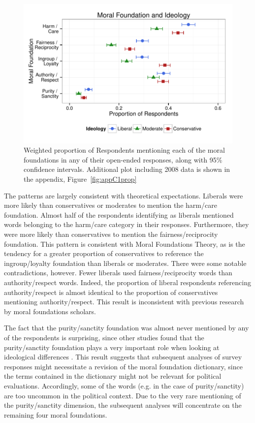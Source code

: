 \documentclass[12pt]{article}
\begin{document}
\begin{figure}[h]\centering
\includegraphics[scale=.9]{../calc/fig/fig1prop.pdf}
\caption{Weighted proportion of Respondents mentioning each of the moral foundations in any of their open-ended responses, along with 95\% confidence intervals. Additional plot including 2008 data is shown in the appendix, Figure~\ref{fig:appC1prop}}\label{fig:1prop}
\end{figure}

The patterns are largely consistent with theoretical expectations. Liberals were more likely than conservatives or moderates to mention the harm/care foundation. Almost half of the respondents identifying as liberals mentioned words belonging to the harm/care category in their responses. Furthermore, they were more likely than conservatives to mention the fairness/reciprocity foundation. This pattern is consistent with Moral Foundations Theory, as is the tendency for a greater proportion of conservatives to reference the ingroup/loyalty foundation than liberals or moderates. There were some notable contradictions, however. Fewer liberals used fairness/reciprocity words than authority/respect words. Indeed, the proportion of liberal respondents referencing authority/respect is almost identical to the proportion of conservatives mentioning authority/respect. This result is inconsistent with previous research by moral foundations scholars.

The fact that the purity/sanctity foundation was almost never mentioned by any of the respondents is surprising, since other studies found that the purity/sanctity foundation plays a very important role when looking at ideological differences \citep{koleva2012tracing}. This result suggests that subsequent analyses of survey responses might necessitate a revision of the moral foundation dictionary, since the terms contained in the dictionary might not be relevant for political evaluations. Accordingly, some of the words (e.g. in the case of purity/sanctity) are too uncommon in the political context. Due to the very rare mentioning of the purity/sanctity dimension, the subsequent analyses will concentrate on the remaining four moral foundations.
\end{document}
